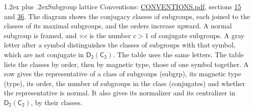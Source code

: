 \documentclass[10pt,a4paper]{article}
\makeatletter
\renewcommand\section{\@startsection{section}{1}{\z@}{-3ex plus -1ex minus -.2ex}%
  {1.2ex plus .2ex}{\normalfont\large\sffamily\bfseries\color{parttitle}}}
\numberwithin{equation}{section}
\newcommand{\grp}[1]{\mathsf{#1}}
\newcommand{\clsletter}[1]{\,{\scriptsize\color{black!55}#1}}
\makeatother
\begin{document}
\section{Subgroup lattice}\label{s:subgroups}
Conventions: \href{../../CONVENTIONS.pdf}{CONVENTIONS.pdf}, sections \href{../../../rotation/CONVENTIONS.pdf\#conv.15}{15} and \href{../../CONVENTIONS.pdf\#conv.36}{36}.
The diagram shows the conjugacy classes of subgroups, each joined to the classes of its maximal subgroups, and the orders increase upward. \label{n:index.conjugates.c}A normal subgroup is framed, and ${\times}c$ is the number $c > 1$ of conjugate subgroups. \label{n:mark.letter}A gray letter after a symbol distinguishes the classes of subgroups with that symbol, which are not conjugate in $\grp{D_{2}}(\grp{C_{2}})$. The table uses the same letters. The table lists the classes by order, then by magnetic type, those of one symbol together. \label{n:head.subgroup}\label{n:head.magnetic.type}\label{n:head.order}\label{n:head.conjugates}\label{n:head.normal}A row gives the representative of a class of subgroups (subgrp), its magnetic type (type), its order, the number of subgroups in the class (conjugates) and whether the representative is normal. \label{n:head.normalizer}\label{n:head.centralizer}It also gives its normalizer and its centralizer in $\grp{D_{2}}(\grp{C_{2}})$, by their classes. 
\begin{center}
\end{center}
\end{document}
